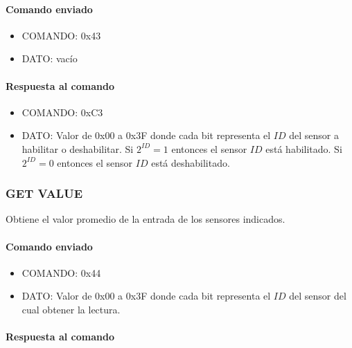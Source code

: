 \paragraph*{Comando enviado}

\begin{itemize}
	\item{COMANDO:} 0x43
	\item{DATO:} vac\'io
\end{itemize}

\paragraph*{Respuesta al comando}

\begin{itemize}
	\item{COMANDO:} 0xC3
	\item{DATO:} Valor de 0x00 a 0x3F donde cada bit representa el $ID$ del sensor a habilitar o deshabilitar.
	Si $2^{ID} = 1$ entonces el sensor $ID$ est\'a habilitado.
	Si $2^{ID} = 0$ entonces el sensor $ID$ est\'a deshabilitado.
\end{itemize}

\subsubsection{GET VALUE}
\label{hA_protocolo_get_value_ds}

Obtiene el valor promedio de la entrada de los sensores indicados.

\paragraph*{Comando enviado}

\begin{itemize}
	\item{COMANDO:} 0x44
	\item{DATO:} Valor de 0x00 a 0x3F donde cada bit representa el $ID$ del sensor del cual obtener la lectura.
\end{itemize}

\paragraph*{Respuesta al comando}

